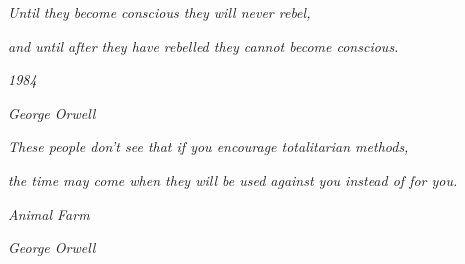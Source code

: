 


\thispagestyle{empty}\mbox{}

\vspace*{4cm}

\small

\hfill \emph{Until they become conscious they will never rebel,}

\hfill \emph{and until after they have rebelled they cannot become conscious.}

\hfill

\hfill \emph{1984}

\hfill \emph{George Orwell}


\hfill \vspace{1cm}

\hfill \emph{These people don’t see that if you encourage totalitarian methods,}

\hfill \emph{the time may come when they will be used against you instead of for
  you.}

\hfill

\hfill \emph{Animal Farm}

\hfill \emph{George Orwell}

\newpage
\thispagestyle{empty}\mbox{}

\newpage


